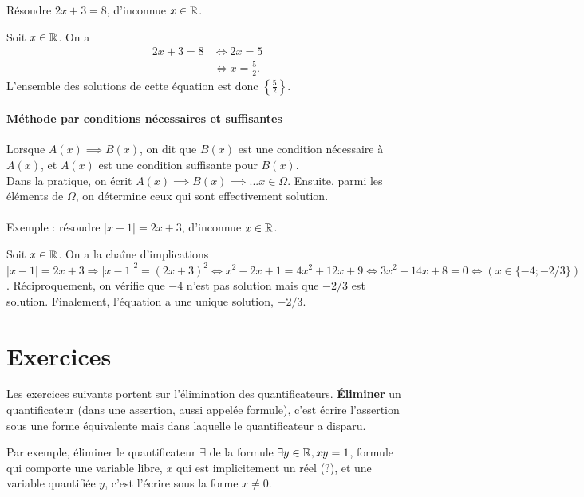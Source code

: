 \begin{exemple}
Résoudre $2x+3=8$, d'inconnue $x\in \mathbb{R}$.
\begin{red}
Soit $x\in \mathbb{R}$. On a 
\begin{align*}
2x+3=8
&\iff 2x=5\\
&\iff x=\frac52.
\end{align*}
L'ensemble des solutions de cette équation est donc $\left\{\frac52\right\}$.
\end{red}
\end{exemple}

\paragraph{Méthode par conditions nécessaires et suffisantes}

Lorsque $A(x) \implies B(x)$, on dit que $B(x)$ est une condition nécessaire à $A(x)$, et $A(x)$ est une condition suffisante pour $B(x)$.\\
Dans la pratique, on écrit $A(x)\implies B(x) \implies ... x\in\Omega$. Ensuite, parmi les éléments de $\Omega$, on détermine ceux qui sont effectivement solution.\\
\\
Exemple : résoudre $|x-1|=2x+3$, d'inconnue $x\in \mathbb{R}$.\\
\begin{red}
Soit $x\in\mathbb{R}$. On a la chaîne d'implications $|x-1|=2x+3 \Rightarrow |x-1|^2=(2x+3)^2 \Leftrightarrow x^2-2x+1=4x^2+12x+9 \iff 3x^2+14x+8=0 \iff (x\in \{-4;-2/3\})$. Réciproquement, on vérifie que $-4$ n'est pas solution mais que $-2/3$ est solution. Finalement, l'équation a une unique solution, $-2/3$.
\end{red}

\section{Exercices}

Les exercices suivants portent sur l'élimination des quantificateurs.
\textbf{Éliminer} un quantificateur (dans une assertion, aussi appelée \og formule\fg), c'est écrire l'assertion sous une forme équivalente mais dans laquelle le quantificateur a disparu.

Par exemple, éliminer le quantificateur $\exists$ de la formule \og $\exists y\in\mathbb{R}, xy=1$\fg, formule qui comporte une variable libre, $x$ qui est implicitement un réel (?), et une variable quantifiée $y$,  c'est l'écrire sous la forme 
$x\neq 0$.

